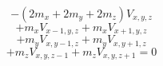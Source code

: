 \documentclass[12pt]{article}
\begin{document}
\begin{displaymath}
-(2m_{x}+2m_{y}+2m_{z})V_{x,y,z}
\end{displaymath}
\begin{displaymath}
+m_{x}V_{x-1,y,z}+m_{x}V_{x+1,y,z}
\end{displaymath}
\begin{displaymath}
+m_{y}V_{x,y-1,z}+m_{y}V_{x,y+1,z}
\end{displaymath}
\begin{displaymath}
+m_{z}V_{x,y,z-1}+m_{z}V_{x,y,z+1}=0
\end{displaymath}
\end{document}
